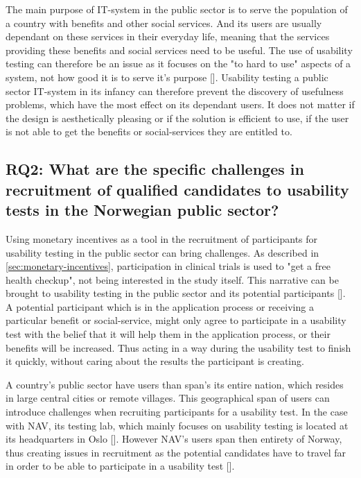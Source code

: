 The main purpose of IT-system in the public sector is to serve the population of a country with benefits and other social services. And its users are usually dependant on these services in their everyday life, meaning that the services providing these benefits and social services need to be useful. The use of usability testing can therefore be an issue as it focuses on the "to hard to use" aspects of a system, not how good it is to serve it's purpose [\cite{sg_2008}]. Usability testing a public sector IT-system in its infancy can therefore prevent the discovery of usefulness problems, which have the most effect on its dependant users. It does not matter if the design is aesthetically pleasing or if the solution is efficient to use, if the user is not able to get the benefits or social-services they are entitled to.

\subsection{RQ2: What are the specific challenges in recruitment of qualified candidates to usability tests in the Norwegian public sector?}
Using monetary incentives as a tool in the recruitment of participants for usability testing in the public sector can bring challenges. As described in \autoref{sec:monetary-incentives}, participation in clinical trials is used to "get a free health checkup", not being interested in the study itself. This narrative can be brought to usability testing in the public sector and its potential participants [\cite{nc_2020}]. A potential participant which is in the application process or receiving a particular benefit or social-service, might only agree to participate in a usability test with the belief that it will help them in the application process, or their benefits will be increased. Thus acting in a way during the usability test to finish it quickly, without caring about the results the participant is creating.

A country's public sector have users than span's its entire nation, which resides in large central cities or remote villages. This geographical span of users can introduce challenges when recruiting participants for a usability test. In the case with NAV, its testing lab, which mainly focuses on usability testing is located at its headquarters in Oslo [\cite{sk_2022}]. However NAV's users span then entirety of Norway, thus creating issues in recruitment as the potential candidates have to travel far in order to be able to participate in a usability test [\cite{pkf_2018}].

